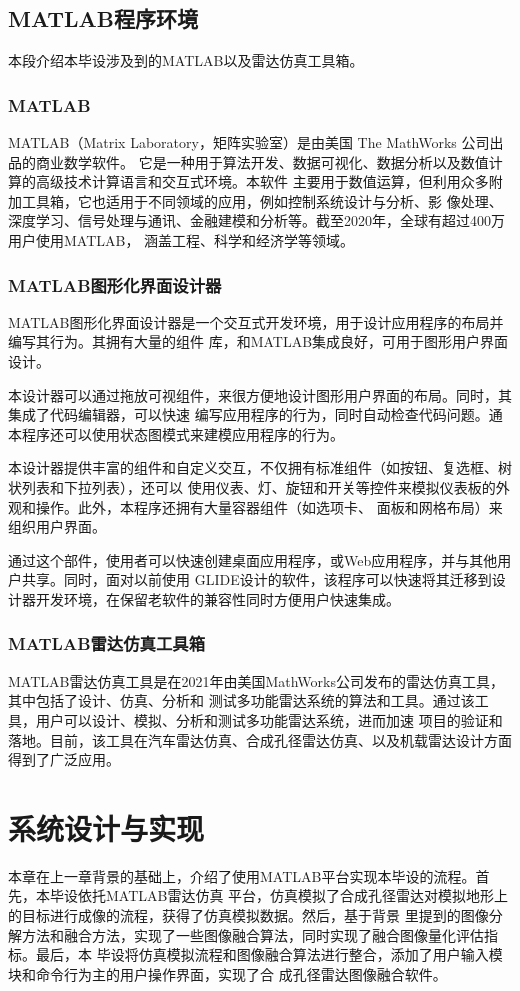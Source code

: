 \documentclass{xduugthesis}
\begin{document}
\section{MATLAB程序环境}
本段介绍本毕设涉及到的MATLAB以及雷达仿真工具箱。
\subsection{MATLAB}
MATLAB（Matrix Laboratory，矩阵实验室）是由美国 The MathWorks 公司出品的商业数学软件。
它是一种用于算法开发、数据可视化、数据分析以及数值计算的高级技术计算语言和交互式环境。本软件
主要用于数值运算，但利用众多附加工具箱，它也适用于不同领域的应用，例如控制系统设计与分析、影
像处理、深度学习、信号处理与通讯、金融建模和分析等。截至2020年，全球有超过400万用户使用MATLAB，
涵盖工程、科学和经济学等领域。
\subsection{MATLAB图形化界面设计器}
MATLAB图形化界面设计器是一个交互式开发环境，用于设计应用程序的布局并编写其行为。其拥有大量的组件
库，和MATLAB集成良好，可用于图形用户界面设计。\par
本设计器可以通过拖放可视组件，来很方便地设计图形用户界面的布局。同时，其集成了代码编辑器，可以快速
编写应用程序的行为，同时自动检查代码问题。通本程序还可以使用状态图模式来建模应用程序的行为。\par
本设计器提供丰富的组件和自定义交互，不仅拥有标准组件（如按钮、复选框、树状列表和下拉列表），还可以
使用仪表、灯、旋钮和开关等控件来模拟仪表板的外观和操作。此外，本程序还拥有大量容器组件（如选项卡、
面板和网格布局）来组织用户界面。\par
通过这个部件，使用者可以快速创建桌面应用程序，或Web应用程序，并与其他用户共享。同时，面对以前使用
GLIDE设计的软件，该程序可以快速将其迁移到设计器开发环境，在保留老软件的兼容性同时方便用户快速集成。\par
\subsection{MATLAB雷达仿真工具箱}
MATLAB雷达仿真工具是在2021年由美国MathWorks公司发布的雷达仿真工具，其中包括了设计、仿真、分析和
测试多功能雷达系统的算法和工具。通过该工具，用户可以设计、模拟、分析和测试多功能雷达系统，进而加速
项目的验证和落地。目前，该工具在汽车雷达仿真、合成孔径雷达仿真、以及机载雷达设计方面得到了广泛应用。
\chapter{系统设计与实现}
本章在上一章背景的基础上，介绍了使用MATLAB平台实现本毕设的流程。首先，本毕设依托MATLAB雷达仿真
平台，仿真模拟了合成孔径雷达对模拟地形上的目标进行成像的流程，获得了仿真模拟数据。然后，基于背景
里提到的图像分解方法和融合方法，实现了一些图像融合算法，同时实现了融合图像量化评估指标。最后，本
毕设将仿真模拟流程和图像融合算法进行整合，添加了用户输入模块和命令行为主的用户操作界面，实现了合
成孔径雷达图像融合软件。
\end{document}
